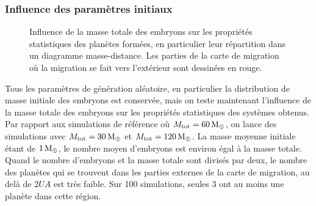 \subsubsection{Influence des paramètres initiaux}
\begin{figure}[htbp]
\centering
{}\hfill
{}

\caption[Influence de la masse totale des embryons sur les propriétés statistiques.]{Influence de la masse totale des embryons
sur les propriétés statistiques des planètes formées, en particulier leur répartition dans un diagramme masse-distance. Les
parties de la carte de migration où la migration se fait vers l'extérieur sont dessinées en
rouge.}\label{fig:HSE_m_tot_influence}
\end{figure}

Tous les paramètres de génération aléatoire, en particulier la distribution de masse initiale des embryons est conservée, mais
on teste maintenant l'influence de la masse totale des embryons sur les propriétés statistiques des systèmes obtenus. Par
rapport aux simulations de référence où $M_\text{tot}=60\mathrm{\thinspace M_\oplus}$, on lance des simulations avec
$M_\text{tot}=30\mathrm{\thinspace M_\oplus}$ et $M_\text{tot}=120\mathrm{\thinspace M_\oplus}$. La masse moyenne initiale étant
de $1\mathrm{\thinspace M_\oplus}$, le nombre moyen d'embryons est environ égal à la masse totale. Quand le nombre d'embryons et la masse totale sont
divisés par deux, le nombre des planètes qui se trouvent dans les parties externes de la carte de migration, au delà de
$2\unit{UA}$ est très faible. Sur 100 simulations, seules 3 ont au moins une planète dans cette région. 


